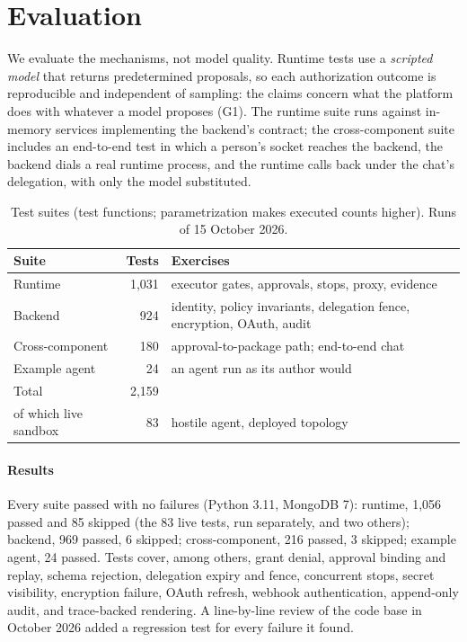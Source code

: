 \documentclass[10pt,twocolumn,a4paper]{article}
\begin{document}
\section{Evaluation}
\label{sec:eval}

We evaluate the mechanisms, not model quality. Runtime tests use a
\emph{scripted model} that returns predetermined proposals, so each
authorization outcome is reproducible and independent of sampling: the
claims concern what the platform does with whatever a model proposes
(G1). The runtime suite runs against in-memory services implementing
the backend's contract; the cross-component suite includes an
end-to-end test in which a person's socket reaches the backend, the
backend dials a real runtime process, and the runtime calls back under
the chat's delegation, with only the model substituted.

\begin{table}[t]
\centering\small
\caption{Test suites (test functions; parametrization makes executed
counts higher). Runs of 15 October 2026.}
\label{tab:suites}
\begin{tabularx}{\columnwidth}{@{}l r >{\raggedright\arraybackslash}X@{}}
\toprule
\textbf{Suite} & \textbf{Tests} & \textbf{Exercises} \\
\midrule
Runtime & 1{,}031 & executor gates, approvals, stops, proxy, evidence \\
Backend & 924 & identity, policy invariants, delegation fence, encryption, OAuth, audit \\
Cross-component & 180 & approval-to-package path; end-to-end chat \\
Example agent & 24 & an agent run as its author would \\
\midrule
Total & 2{,}159 & \\
\quad of which live sandbox & 83 & hostile agent, deployed topology \\
\bottomrule
\end{tabularx}
\end{table}

\paragraph{Results}
Every suite passed with no failures (Python 3.11, MongoDB 7): runtime,
1{,}056 passed and 85 skipped (the 83 live tests, run separately, and
two others); backend, 969 passed, 6 skipped; cross-component, 216
passed, 3 skipped; example agent, 24 passed. Tests cover, among others,
grant denial, approval binding and replay, schema rejection, delegation
expiry and fence, concurrent stops, secret visibility, encryption
failure, OAuth refresh, webhook authentication, append-only audit, and
trace-backed rendering. A line-by-line review of the code base in
October 2026 added a regression test for every failure it found.
\end{document}
